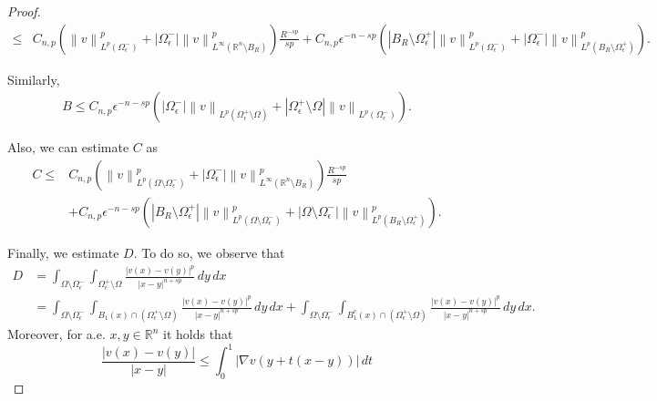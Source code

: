 \documentclass[12pt]{article}
\newcommand{\R}{\mathbb{R}}
\numberwithin{equation}{section}
\renewcommand{\leq}{\leqslant}
\begin{document}
\begin{appendix}
\begin{proof}
\begin{equation}
\begin{split}
\leq & C_{n,p}\left(\left\|v\right\|_{L^p(\Omega_{\epsilon}^-)}^p+\left|\Omega_{\epsilon}^-\right|\left\|v\right\|_{L^\infty(\R^n\setminus B_R)}^p\right)\frac{R^{-sp}}{sp}+ C_{n,p} \epsilon^{-n-sp} \left(\left|B_R\setminus \Omega_{\epsilon}^{+}\right|\left\|v\right\|_{L^p(\Omega_{\epsilon}^-)}^p+\left|\Omega_{\epsilon}^-\right|\left\|v\right\|_{L^p(B_R\setminus \Omega_{\epsilon}^+)}^p\right).
\end{split}
\end{equation} 

Similarly, 
\begin{equation}\label{oldfvert}
\begin{split}
B \leq C_{n,p}\epsilon^{-n-sp}\left(\left|\Omega_{\epsilon}^-\right|\left\|v\right\|_{L^p(\Omega_{\epsilon}^+\setminus \Omega)}+\left|\Omega_{\epsilon}^+\setminus \Omega\right|\left\|v\right\|_{L^p(\Omega_{\epsilon}^-)}                 \right).
\end{split}
\end{equation}
 
Also, we can estimate $C$ as 
\begin{equation}\label{kelorfce}
\begin{split}
C\leq & C_{n,p}\left(\left\|v\right\|_{L^p(\Omega\setminus \Omega_{\epsilon}^-)}^p+\left|\Omega_{\epsilon}^-\right|\left\|v\right\|_{L^\infty(\R^n\setminus B_R)}^p\right)\frac{R^{-sp}}{sp}\\
&+ C_{n,p} \epsilon^{-n-sp} \left(\left|B_R\setminus \Omega_{\epsilon}^{+}\right|\left\|v\right\|_{L^p(\Omega\setminus \Omega_{\epsilon}^-)}^p+\left|\Omega\setminus \Omega_{\epsilon}^-\right|\left\|v\right\|_{L^p(B_R\setminus \Omega_{\epsilon}^+)}^p\right).
\end{split}
\end{equation}

Finally, we estimate $D$. To do so, we observe that 
\begin{equation}\label{guglielmo}
\begin{split}
D&=\int_{\Omega\setminus \Omega_{\epsilon}^{-}}\int_{\Omega_{\epsilon}^{+}\setminus \Omega } \frac{\left|v(x)-v(y)\right|^p}{\left|x-y\right|^{n+sp}}\,dy\,dx\\
&=\int_{\Omega\setminus \Omega_{\epsilon}^{-}}\int_{B_1(x)\cap \left(\Omega_{\epsilon}^{+}\setminus \Omega\right)} \frac{\left|v(x)-v(y)\right|^p}{\left|x-y\right|^{n+sp}}\,dy\,dx+ \int_{\Omega\setminus \Omega_{\epsilon}^{-}}\int_{B_1^c(x)\cap \left(\Omega_{\epsilon}^{+}\setminus \Omega\right)} \frac{\left|v(x)-v(y)\right|^p}{\left|x-y\right|^{n+sp}}\,dy\,dx.
\end{split}
\end{equation} 
Moreover, for a.e. $x,y\in \R^n$ it holds that 
\begin{equation*}
\frac{\left|v(x)-v(y)\right|}{\left|x-y\right|} \leq \int_{0}^1\left|\nabla v(y+t(x-y))\right|\,dt 
\end{equation*}


\end{proof}
\end{appendix}
\end{document}
